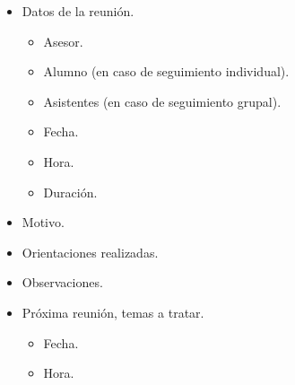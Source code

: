 \begin{itemize}
   \item Datos de la reunión.
   \begin{itemize}
      \item Asesor.
      \item Alumno (en caso de seguimiento individual).
      \item Asistentes (en caso de seguimiento grupal).
      \item Fecha.
      \item Hora.
      \item Duración.
   \end{itemize}
   \item Motivo.
   \item Orientaciones realizadas.
   \item Observaciones.
   \item Próxima reunión, temas a tratar.
   \begin{itemize}
      \item Fecha.
      \item Hora.
   \end{itemize}
\end{itemize}
